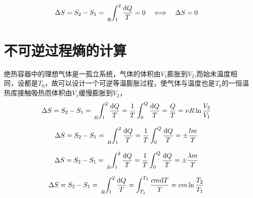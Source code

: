 \par \dya[绝热可逆过程的熵变]
\begin{equation*}
\Delta S=S_2-S_1=\sideset{_R}{}{\int_{1}^{2}}\frac{{\rm{d}} Q}{T}=0 \quad  \Longleftrightarrow \quad \Delta S =0
\end{equation*}

\section{不可逆过程熵的计算}
\dya[绝热自由膨胀] 绝热容器中的理想气体是一孤立系统，气体的体积由$V_1$膨胀到$V_2$,而始末温度相同，设都是$T_0$，故可以设计一个可逆等温膨胀过程，使气体与温度也是$T_0$的一恒温热库接触吸热而体积由$V_1$缓慢膨胀到$V_2$，
\begin{equation*}
\Delta S=S_2-S_1=\sideset{_R}{}{\int_{1}^{2}}\frac{{\rm{d}} Q}{T}=\frac{1}{T}\int_{0}^{Q}\frac{{\rm{d}} Q}{T}=\frac{Q}{T}=\nu R \ln{\frac{V_2}{V_1}}
\end{equation*}

\dya[气液相变] 
\begin{equation*}
\Delta S=S_2-S_1=\sideset{_R}{}{\int_{1}^{2}}\frac{{\rm{d}} Q}{T}=\frac{1}{T}\int_{0}^{Q}\frac{{\rm{d}} Q}{T}=\pm \frac{lm}{T}
\end{equation*}

\dya[固液相变] 
\begin{equation*}
\Delta S=S_2-S_1=\sideset{_R}{}{\int_{1}^{2}}\frac{{\rm{d}} Q}{T}=\frac{1}{T}\int_{0}^{Q}\frac{{\rm{d}} Q}{T}=\pm \frac{\lambda m}{T}
\end{equation*}

\dya[同相温变] 
\begin{equation*}
\Delta S=S_2-S_1=\sideset{_R}{}{\int_{1}^{2}}\frac{{\rm{d}} Q}{T}=\int_{T_1}^{T_2}\frac{ cm{\rm{d}} T}{T}=cm\ln{\frac{T_2}{T_1}}
\end{equation*}

